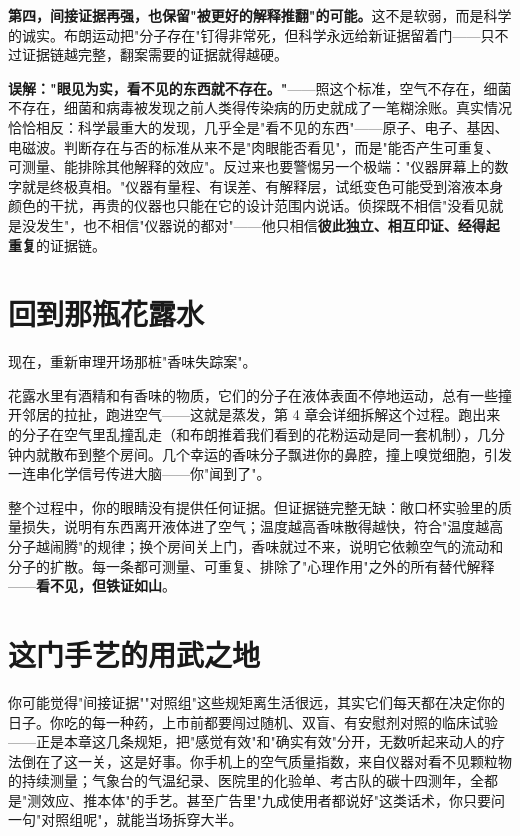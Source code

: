 \textbf{第四，间接证据再强，也保留"被更好的解释推翻"的可能。}这不是软弱，而是科学的诚实。布朗运动把"分子存在"钉得非常死，但科学永远给新证据留着门——只不过证据链越完整，翻案需要的证据就得越硬。

\begin{wuqu}
\textbf{误解："眼见为实，看不见的东西就不存在。"}——照这个标准，空气不存在，细菌不存在，细菌和病毒被发现之前人类得传染病的历史就成了一笔糊涂账。真实情况恰恰相反：科学最重大的发现，几乎全是"看不见的东西"——原子、电子、基因、电磁波。判断存在与否的标准从来不是"肉眼能否看见"，而是"能否产生可重复、可测量、能排除其他解释的效应"。反过来也要警惕另一个极端："仪器屏幕上的数字就是终极真相。"仪器有量程、有误差、有解释层，试纸变色可能受到溶液本身颜色的干扰，再贵的仪器也只能在它的设计范围内说话。侦探既不相信"没看见就是没发生"，也不相信"仪器说的都对"——他只相信\textbf{彼此独立、相互印证、经得起重复}的证据链。
\end{wuqu}

\section{回到那瓶花露水}

现在，重新审理开场那桩"香味失踪案"。

花露水里有酒精和有香味的物质，它们的分子在液体表面不停地运动，总有一些撞开邻居的拉扯，跑进空气——这就是蒸发，第 4 章会详细拆解这个过程。跑出来的分子在空气里乱撞乱走（和布朗推着我们看到的花粉运动是同一套机制），几分钟内就散布到整个房间。几个幸运的香味分子飘进你的鼻腔，撞上嗅觉细胞，引发一连串化学信号传进大脑——你"闻到了"。

整个过程中，你的眼睛没有提供任何证据。但证据链完整无缺：敞口杯实验里的质量损失，说明有东西离开液体进了空气；温度越高香味散得越快，符合"温度越高分子越闹腾"的规律；换个房间关上门，香味就过不来，说明它依赖空气的流动和分子的扩散。每一条都可测量、可重复、排除了"心理作用"之外的所有替代解释——\textbf{看不见，但铁证如山}。

\section{这门手艺的用武之地}

你可能觉得"间接证据""对照组"这些规矩离生活很远，其实它们每天都在决定你的日子。你吃的每一种药，上市前都要闯过随机、双盲、有安慰剂对照的临床试验——正是本章这几条规矩，把"感觉有效"和"确实有效"分开，无数听起来动人的疗法倒在了这一关，这是好事。你手机上的空气质量指数，来自仪器对看不见颗粒物的持续测量；气象台的气温纪录、医院里的化验单、考古队的碳十四测年，全都是"测效应、推本体"的手艺。甚至广告里"九成使用者都说好"这类话术，你只要问一句"对照组呢"，就能当场拆穿大半。

